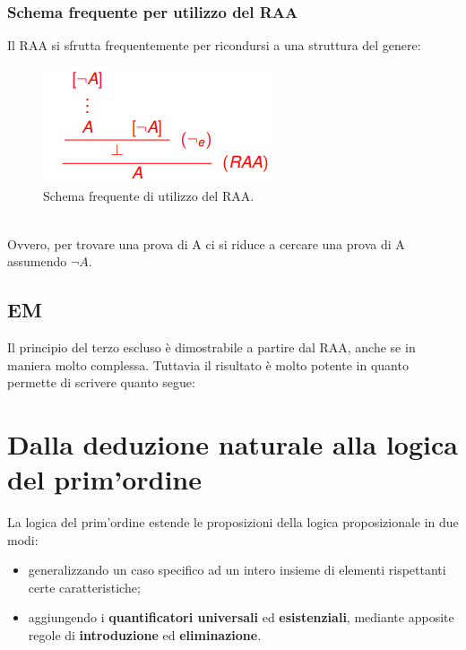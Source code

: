 \documentclass[12pt]{article}
\begin{document}
\subsubsection{Schema frequente per utilizzo del RAA}
\label{sssec:RAA_schema}
Il RAA si sfrutta frequentemente per ricondursi a una struttura del genere:
\begin{figure}[!htb]
    \centering
    \includegraphics[width=.9\linewidth,height=.2\textheight,keepaspectratio]{logica_proposizionale/introduzione/RAA_schema.png} %
    \begin{center}
        \caption{\label{fig:RAA_schema}Schema frequente di utilizzo del RAA.} %
    \end{center}
\end{figure}
\\
Ovvero, per trovare una prova di A ci si riduce a cercare una prova di A assumendo $\neg A$.

\subsection{EM}
\label{ssec:EM}
Il principio del terzo escluso è dimostrabile a partire dal RAA, anche se in maniera molto complessa. Tuttavia il risultato è molto potente in quanto permette di scrivere quanto segue:

\section{Dalla deduzione naturale alla logica del prim'ordine}
\label{sec:natural_and_first_order_logic}
La logica del prim'ordine estende le proposizioni della logica proposizionale in due modi:
\begin{itemize}
    \item generalizzando un caso specifico ad un intero insieme di elementi rispettanti certe caratteristiche;
    \item aggiungendo i \textbf{quantificatori universali} ed \textbf{esistenziali}, mediante apposite regole di \textbf{introduzione} ed \textbf{eliminazione}.
\end{itemize}
\end{document}
